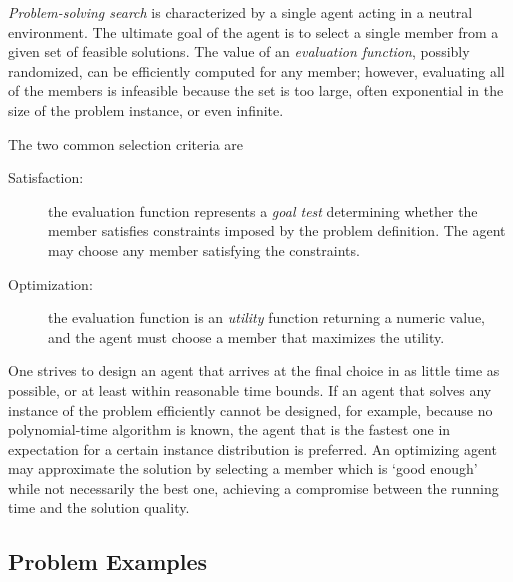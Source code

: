 {\em Problem-solving search} is characterized by a single agent acting
in a neutral environment\cite{Russell.aima}. The ultimate goal of the
agent is to select a single member from a given set of feasible
solutions. The value of an {\em evaluation function}, possibly
randomized, can be efficiently computed for any member; however,
evaluating all of the members is infeasible because the set is too
large, often exponential in the size of the problem instance, or
even infinite.

The two common selection criteria are 
\begin{description}
  \item[Satisfaction:] the evaluation function represents a {\em goal
    test} determining whether the member satisfies constraints imposed
    by the problem definition. The agent may choose any member
    satisfying the constraints.

  \item[Optimization:] the evaluation function is an {\em utility} function
    returning a numeric value, and the agent must choose a member that
    maximizes the utility.
\end{description}

One strives to design an agent that arrives at the final choice in as
little time as possible, or at least within reasonable time bounds.
If an agent that solves any instance of the problem efficiently cannot
be designed, for example, because no polynomial-time algorithm is
known, the agent that is the fastest one in expectation for a certain
instance distribution is preferred.  An optimizing agent may
approximate the solution by selecting a member which is `good enough'
while not necessarily the best one, achieving a compromise between the
running time and the solution quality.

\subsection{Problem Examples}

